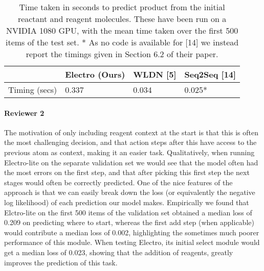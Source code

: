 \documentclass{article}
\begin{document}
 
 

\begin{table}[h]
  \caption{Time taken in seconds to predict product from the initial reactant and reagent molecules.
  These have been run on a NVIDIA 1080 GPU, with the mean time taken over the first 500 items of the test set.
  * As no code is available for [14] we instead report the timings given in Section 6.2 of their paper.
  }
  \label{table:timings}
  \centering
  \begin{tabular}{llll}
    \toprule
    & Electro (Ours) & WLDN [5] & Seq2Seq [14]  \\
    \midrule
    Timing (secs) & 0.337   & 0.034 &  0.025*     \\
    \bottomrule
  \end{tabular}
\end{table}

\paragraph{Reviewer 2}
The motivation of only including reagent context at the start is that this is often the most challenging decision, and that action steps after this have access to the previous atom as context, making it an easier task.
Qualitatively, when running Electro-lite on the separate validation set we would see that the model often had the most errors on the first step, and that after picking this first step the next stages would often be correctly predicted.
One of the nice features of the approach is that we can easily break down the loss (or equivalently the negative log likelihood) of each prediction our model makes. 
Empirically we found that Elctro-lite on the first 500 items of the validation set obtained a median loss of 0.209 on predicting where to start, whereas the first add step (when applicable) would contribute a median loss of 0.002, highlighting the sometimes much poorer performance of this module.
When testing Electro, its initial select module would get a median loss of 0.023, showing that the addition of reagents, greatly improves the prediction of this task.
\end{document}
